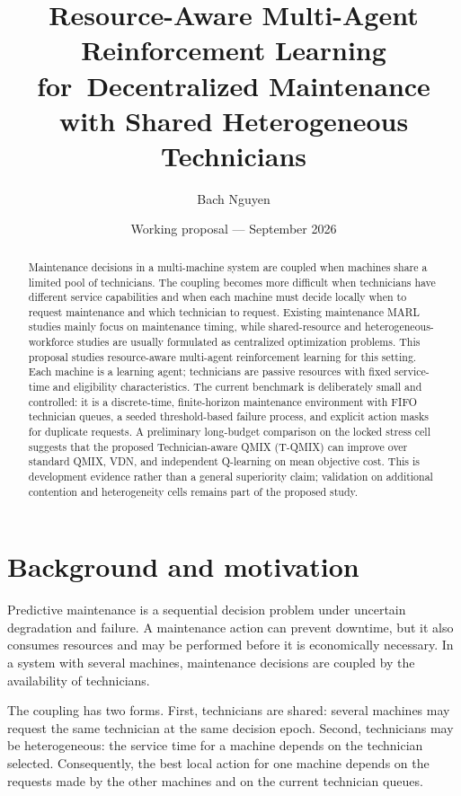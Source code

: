 \documentclass[11pt]{article}
\title{Resource-Aware Multi-Agent Reinforcement Learning for\
Decentralized Maintenance with Shared Heterogeneous Technicians}
\author{Bach Nguyen}
\date{Working proposal --- September 2026}
\begin{document}
\maketitle

\begin{abstract}
Maintenance decisions in a multi-machine system are coupled when machines share a limited pool of technicians. The coupling becomes more difficult when technicians have different service capabilities and when each machine must decide locally when to request maintenance and which technician to request. Existing maintenance MARL studies mainly focus on maintenance timing, while shared-resource and heterogeneous-workforce studies are usually formulated as centralized optimization problems. This proposal studies resource-aware multi-agent reinforcement learning for this setting. Each machine is a learning agent; technicians are passive resources with fixed service-time and eligibility characteristics. The current benchmark is deliberately small and controlled: it is a discrete-time, finite-horizon maintenance environment with FIFO technician queues, a seeded threshold-based failure process, and explicit action masks for duplicate requests. A preliminary long-budget comparison on the locked stress cell suggests that the proposed Technician-aware QMIX (T-QMIX) can improve over standard QMIX, VDN, and independent Q-learning on mean objective cost. This is development evidence rather than a general superiority claim; validation on additional contention and heterogeneity cells remains part of the proposed study.
\end{abstract}

\section{Background and motivation}

Predictive maintenance is a sequential decision problem under uncertain degradation and failure. A maintenance action can prevent downtime, but it also consumes resources and may be performed before it is economically necessary. In a system with several machines, maintenance decisions are coupled by the availability of technicians.

The coupling has two forms. First, technicians are shared: several machines may request the same technician at the same decision epoch. Second, technicians may be heterogeneous: the service time for a machine depends on the technician selected. Consequently, the best local action for one machine depends on the requests made by the other machines and on the current technician queues.
\end{document}
